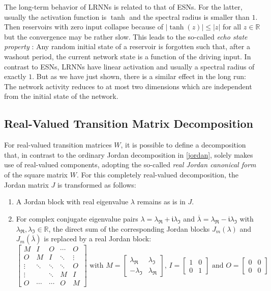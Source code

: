 \documentclass[twoside,11pt]{article}
\theoremstyle{definition}
\begin{document}
The long-term behavior of LRNNs is related to that of ESNs. For the latter,
usually the activation function is $\tanh$ and the spectral radius is smaller
than $1$. Then reservoirs with zero input collapse because of $|\!\tanh(z)| \le
|z|$ for all $z \in \mathbb{R}$ but the convergence may be rather slow. This leads
to the so-called \emph{echo state property} \citep{MJ13}: Any random initial
state of a reservoir is forgotten such that, after a washout period, the current
network state is a function of the driving input. In contrast to ESNs, LRNNs
have linear activation and usually a spectral radius of exactly $1$.
But as we have just shown, there is a similar effect in the long run: The
network activity reduces to at most two dimensions which are independent from
the initial state of the network.

\subsection{Real-Valued Transition Matrix Decomposition}\label{real}

For real-valued transition matrices $W$, it is possible to define a
decomposition that, in contrast to the ordinary Jordan decomposition in
\cref{jordan}, solely makes use of real-valued components, adopting the
so-called \emph{real Jordan canonical form} \cite[Sect.~3.4.1]{HJ13} of the
square matrix $W$.
For this completely real-valued decomposition, the Jordan matrix $J$ is
transformed as follows:
\begin{enumerate}
  \item A Jordan block with real eigenvalue $\lambda$ remains as is in $J$.
  \item For complex conjugate eigenvalue pairs $\lambda = \lambda_\Re +
	\mathfrak{i}\lambda_\Im$ and $\overline{\lambda} = \lambda_\Re - \mathfrak{i}\lambda_\Im$
	with $\lambda_\Re,\lambda_\Im \in \mathbb{R}$, the
	direct sum of the corresponding Jordan blocks $J_m(\lambda)$ and
	$J_m(\overline{\lambda})$ is replaced by a real Jordan block:
	\[
	  \left[ \begin{array}{*{5}{c}}
		M & I & O & \cdots & O\\
		O & M & I & \ddots & \vdots\\
		\vdots & \ddots & \ddots & \ddots & O\\
		\vdots & & \ddots & M & I\\
		O & \cdots & \cdots & O & M
	  \end{array} \right]
	  \text{~with~}
	  M = \left[ \begin{array}{cc}
		\lambda_\Re & \lambda_\Im\\
		-\lambda_\Im & \lambda_\Re
	  \end{array} \right]
	  \!\text{, }
	  I = \left[ \begin{array}{cc}
		1 & 0\\
		0 & 1
	  \end{array} \right]
	  \text{ and }
	  O = \left[ \begin{array}{cc}
		0 & 0\\
		0 & 0
	  \end{array} \right]
	\]
\end{enumerate}
\end{document}

